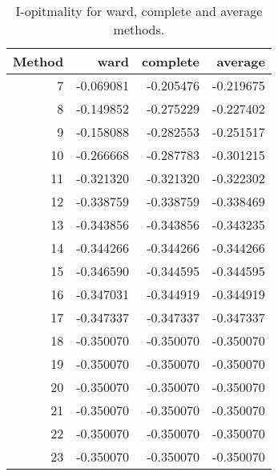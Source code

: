 \begin{table}[htbp]
\centering
\begin{tabular}{rrrr}
\toprule
   Method &      ward &   complete &   average \\
\midrule
        7 & -0.069081 &  -0.205476 & -0.219675 \\
        8 & -0.149852 &  -0.275229 & -0.227402 \\
        9 & -0.158088 &  -0.282553 & -0.251517 \\
       10 & -0.266668 &  -0.287783 & -0.301215 \\
       11 & -0.321320 &  -0.321320 & -0.322302 \\
       12 & -0.338759 &  -0.338759 & -0.338469 \\
       13 & -0.343856 &  -0.343856 & -0.343235 \\
       14 & -0.344266 &  -0.344266 & -0.344266 \\
       15 & -0.346590 &  -0.344595 & -0.344595 \\
       16 & -0.347031 &  -0.344919 & -0.344919 \\
       17 & -0.347337 &  -0.347337 & -0.347337 \\
       18 & -0.350070 &  -0.350070 & -0.350070 \\
       19 & -0.350070 &  -0.350070 & -0.350070 \\
       20 & -0.350070 &  -0.350070 & -0.350070 \\
       21 & -0.350070 &  -0.350070 & -0.350070 \\
       22 & -0.350070 &  -0.350070 & -0.350070 \\
       23 & -0.350070 &  -0.350070 & -0.350070 \\
\bottomrule
\end{tabular}
\caption{I-opitmality for ward, complete and average methods.}
\label{tab:I-opitmality for ward, complete and average methods.}
\end{table}